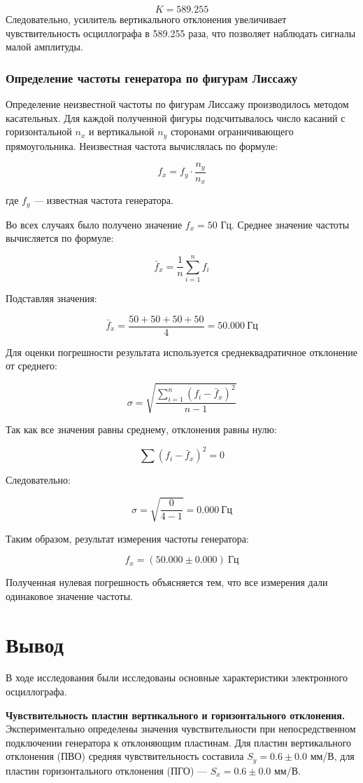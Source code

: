 \documentclass[a4paper,14pt]{extarticle}
\theoremstyle{plain}
\theoremstyle{remark}
\theoremstyle{definition}
\begin{document}
\[
K = 589.255
\]
Следовательно, усилитель вертикального отклонения увеличивает чувствительность осциллографа в 589.255 раза, что позволяет наблюдать сигналы малой амплитуды.
\subsubsection{Определение частоты генератора по фигурам Лиссажу}
Определение неизвестной частоты по фигурам Лиссажу производилось методом касательных. Для каждой полученной фигуры подсчитывалось число касаний с горизонтальной \( n_x \) и вертикальной \( n_y \) сторонами ограничивающего прямоугольника. Неизвестная частота вычислялась по формуле:

\[
f_x = f_y \cdot \frac{n_y}{n_x}
\]

где \( f_y \) — известная частота генератора.

Во всех случаях было получено значение \(f_x = 50\) Гц. 
Среднее значение частоты вычисляется по формуле:

\[
\bar{f}_x = \frac{1}{n} \sum_{i=1}^{n} f_{i}
\]

Подставляя значения:

\[
\bar{f}_x = \frac{50 + 50 + 50 + 50}{4} = 50.000 \ \text{Гц}
\]

Для оценки погрешности результата используется среднеквадратичное отклонение от среднего:

\[
\sigma = \sqrt{\frac{\sum_{i=1}^{n} (f_{i} - \bar{f}_x)^2}{n-1}}
\]

Так как все значения равны среднему, отклонения равны нулю:

\[
\sum (f_{i} - \bar{f}_x)^2 = 0
\]

Следовательно:

\[
\sigma = \sqrt{\frac{0}{4-1}} = 0.000 \ \text{Гц}
\]

Таким образом, результат измерения частоты генератора:

\[
f_x = (50.000 \pm 0.000) \ \text{Гц}
\]

Полученная нулевая погрешность объясняется тем, что все измерения дали одинаковое значение частоты.

\section{Вывод}
В ходе исследования были исследованы основные характеристики электронного осциллографа.

\textbf{Чувствительность пластин вертикального и горизонтального отклонения.} 
    Экспериментально определены значения чувствительности при непосредственном подключении генератора к отклоняющим пластинам. Для пластин вертикального отклонения (ПВО) средняя чувствительность составила \(S_y = 0.6 \pm 0.0\) мм/В, для пластин горизонтального отклонения (ПГО) — \(S_x = 0.6 \pm 0.0\) мм/В. 
    
\end{document}
